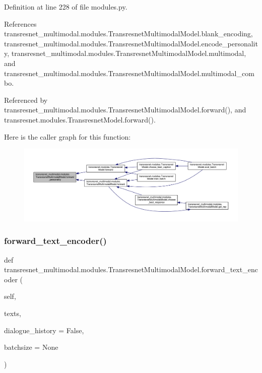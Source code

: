 Definition at line 228 of file modules.\+py.



References transresnet\+\_\+multimodal.\+modules.\+Transresnet\+Multimodal\+Model.\+blank\+\_\+encoding, transresnet\+\_\+multimodal.\+modules.\+Transresnet\+Multimodal\+Model.\+encode\+\_\+personality, transresnet\+\_\+multimodal.\+modules.\+Transresnet\+Multimodal\+Model.\+multimodal, and transresnet\+\_\+multimodal.\+modules.\+Transresnet\+Multimodal\+Model.\+multimodal\+\_\+combo.



Referenced by transresnet\+\_\+multimodal.\+modules.\+Transresnet\+Multimodal\+Model.\+forward(), and transresnet.\+modules.\+Transresnet\+Model.\+forward().

Here is the caller graph for this function\+:
\nopagebreak
\begin{figure}[H]
\begin{center}
\leavevmode
\includegraphics[width=350pt]{classtransresnet__multimodal_1_1modules_1_1TransresnetMultimodalModel_a50a29d40246542bad1cf6fc380d66327_icgraph}
\end{center}
\end{figure}
\mbox{\label{classtransresnet__multimodal_1_1modules_1_1TransresnetMultimodalModel_a0891aec01eb1a1bafb5b291296581e25}} 
\subsubsection{\texorpdfstring{forward\+\_\+text\+\_\+encoder()}{forward\_text\_encoder()}}
{\footnotesize\ttfamily def transresnet\+\_\+multimodal.\+modules.\+Transresnet\+Multimodal\+Model.\+forward\+\_\+text\+\_\+encoder (\begin{DoxyParamCaption}\item[{}]{self,  }\item[{}]{texts,  }\item[{}]{dialogue\+\_\+history = {\ttfamily False},  }\item[{}]{batchsize = {\ttfamily None} }\end{DoxyParamCaption})}

